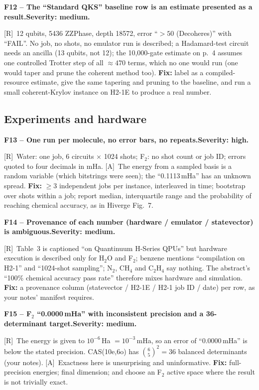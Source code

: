 \documentclass[11pt,a4paper]{article}
\newcommand{\lR}{\textcolor{keyblue}{[R]}}   %
\newcommand{\lA}{\textcolor{notegray}{[A]}}  %
\newcommand{\sev}[1]{\textbf{Severity: #1.}}
\newcommand{\flaw}[4]{\par\medskip\noindent\textbf{#1 -- #2.}\quad{\small\textcolor{notegray}{Where: #3.}}\quad\sev{#4}\par\nobreak}
\begin{document}
\flaw{F12}{The ``Standard QKS'' baseline row is an estimate presented as a result}{p.~10, Table~1; p.~4, Sec.~2.1}{medium}
\lR\ 12 qubits, 5436 ZZPhase, depth 18572, error ``$>50$ (Decoheres)'' with ``FAIL''. No job, no shots, no emulator run is described; a Hadamard-test circuit needs an ancilla (13 qubits, not 12); the 10,000-gate estimate on p.~4 assumes one controlled Trotter step of all $\approx470$ terms, which no one would run (one would taper and prune the coherent method too). \textbf{Fix:} label as a compiled-resource estimate, give the same tapering and pruning to the baseline, and run a small coherent-Krylov instance on H2-1E to produce a real number.

\subsection{Experiments and hardware}

\flaw{F13}{One run per molecule, no error bars, no repeats}{pp.~9--10, Secs.~4.1--4.3}{high}
\lR\ Water: one job, 6 circuits $\times$ 1024 shots; F$_2$: no shot count or job ID; errors quoted to four decimals in mHa. \lA\ The energy from a sampled basis is a random variable (which bitstrings were seen); the ``0.1113\,mHa'' has an unknown spread. \textbf{Fix:} $\ge3$ independent jobs per instance, interleaved in time; bootstrap over shots within a job; report median, interquartile range and the probability of reaching chemical accuracy, as in Hiverge Fig.~7.

\flaw{F14}{Provenance of each number (hardware / emulator / statevector) is ambiguous}{p.~11, Table~3 and Secs.~5.1--5.2}{medium}
\lR\ Table~3 is captioned ``on Quantinuum H-Series QPUs'' but hardware execution is described only for H$_2$O and F$_2$; benzene mentions ``compilation on H2-1'' and ``1024-shot sampling''; N$_2$, CH$_4$ and C$_2$H$_4$ say nothing. The abstract's ``100\% chemical accuracy pass rate'' therefore mixes hardware and simulation. \textbf{Fix:} a provenance column (statevector / H2-1E / H2-1 job ID / date) per row, as your notes' manifest requires.

\flaw{F15}{F$_2$ ``0.0000\,mHa'' with inconsistent precision and a 36-determinant target}{p.~10, Sec.~4.3, Table~2}{medium}
\lR\ The energy is given to $10^{-6}$\,Ha $=10^{-3}$\,mHa, so an error of ``0.0000\,mHa'' is below the stated precision. CAS(10e,6o) has $\binom{6}{5}^2=36$ balanced determinants (your notes). \lA\ Exactness here is unsurprising and uninformative. \textbf{Fix:} full-precision energies; final dimension; and choose an F$_2$ active space where the result is not trivially exact.
\end{document}
